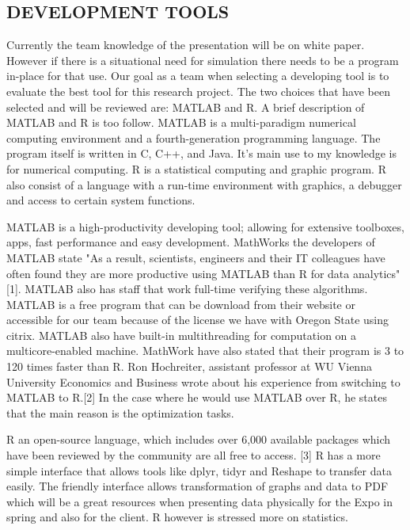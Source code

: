 \documentclass[a4,draftclsnofoot,onecolumn,margin=0.75,10pt]{IEEEtran}
\begin{document}
\subsection[DEVELOPMENT TOOLS]{\rmfamily\color{black}
DEVELOPMENT TOOLS}
{\color{black}
   Currently the team knowledge of the presentation will be on white paper. However if there is a situational need for simulation there needs to be a program in-place for that use. Our goal as a team when selecting a developing tool is to evaluate the best tool for this research project. The two choices that have been selected and will be reviewed are: MATLAB and R. A brief description of MATLAB and R is too follow. MATLAB is a multi-paradigm numerical computing environment and a fourth-generation programming language. The program itself is written in C, C++, and Java. It's main use to my knowledge is for numerical computing. R is a statistical computing and graphic program. R also consist of a language with a run-time environment with graphics, a debugger and   access to certain system functions.

   MATLAB is a high-productivity developing tool; allowing for extensive toolboxes, apps, fast performance and easy development. MathWorks the developers of MATLAB state "As a result, scientists, engineers and their IT colleagues have often found they are more productive using MATLAB than R for data analytics"[1]. MATLAB also has staff that work full-time verifying these algorithms. MATLAB is a free program that can be download from their website or accessible for our team because of the license we have with Oregon State using citrix. MATLAB also have built-in multithreading for computation on a multicore-enabled machine. MathWork have also stated that their program is 3 to 120 times faster than R.  Ron Hochreiter, assistant professor at WU Vienna University Economics and Business wrote about his experience from switching to MATLAB to R.[2] In the case where he would use MATLAB over R, he states that the main reason is the optimization tasks. 

   R an open-source language, which includes over 6,000 available packages which have been reviewed by the community are all free to access. [3] R has a more simple interface that allows tools like dplyr, tidyr and Reshape to transfer data easily. The friendly interface allows transformation of graphs and data to PDF which will be a great resources when presenting data physically for the Expo in spring and also for the client. R however is stressed more on statistics.

}
\end{document}
